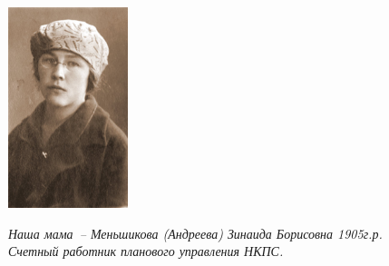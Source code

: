\documentclass[utf8x, 12pt]{G7-32a} %
\begin{document}
\frontmatter %


\thispagestyle{empty} 

\begin{figure}[h!]
    \begin{minipage}[h!]{50mm}
         \begin{center}
         \vspace{-15pt}
         \includegraphics[width=35mm]{inc/Menshekovy/11.jpg} 
         \end{center}
         \itshape{Наша мама~-- Меньшикова (Андреева) Зинаида Борисовна 1905г.р. Счетный работник планового управления НКПС.}
    \end{minipage}
    \hfill
   \begin{minipage}[h]{70mm}

\end{minipage}
\end{figure}
\end{document}
